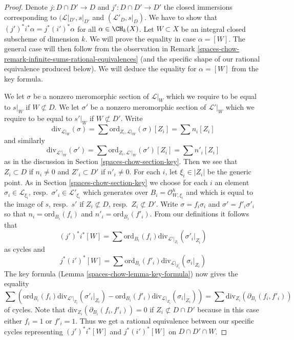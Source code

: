 \begin{proof}
Denote $j : D \cap D' \to D$ and $j' : D \cap D' \to D'$ the closed
immersions corresponding to $(\mathcal{L}|_{D'}, s|_{D'}$ and
$(\mathcal{L}'_D, s|_D)$. We have to show that
$(j')^*i^*\alpha = j^* (i')^*\alpha$ for all $\alpha \in \CH_k(X)$.
Let $W \subset X$ be an integral closed subscheme of dimension $k$.
We will prove the equality in case $\alpha = [W]$.
The general case will then follow from the observation in
Remark \ref{spaces-chow-remark-infinite-sums-rational-equivalences}
(and the specific shape of our rational equivalence produced below).
We will deduce the equality for $\alpha = [W]$ from the key formula.

\medskip\noindent
We let $\sigma$ be a nonzero meromorphic section of $\mathcal{L}|_W$
which we require to be equal to $s|_W$ if $W \not \subset D$.
We let $\sigma'$ be a nonzero meromorphic section of $\mathcal{L}'|_W$
which we require to be equal to $s'|_W$ if $W \not \subset D'$.
Write
$$
\text{div}_{\mathcal{L}|_W}(\sigma) =
\sum \text{ord}_{Z_i, \mathcal{L}|_W}(\sigma)[Z_i] = \sum n_i[Z_i]
$$
and similarly
$$
\text{div}_{\mathcal{L}'|_W}(\sigma') =
\sum \text{ord}_{Z_i, \mathcal{L}'|_W}(\sigma')[Z_i] = \sum n'_i[Z_i]
$$
as in the discussion in Section \ref{spaces-chow-section-key}.
Then we see that $Z_i \subset D$ if $n_i \not = 0$ and
$Z'_i \subset D'$ if $n'_i \not = 0$. For each $i$, let $\xi_i \in |Z_i|$
be the generic point. As in Section \ref{spaces-chow-section-key} we choose
for each $i$ an element
$\sigma_i \in \mathcal{L}_{\xi_i}$, resp.\ $\sigma'_i \in \mathcal{L}'_{\xi_i}$
which generates over $B_i = \mathcal{O}_{W, \xi_i}^h$
and which is equal to the image of
$s$, resp.\ $s'$ if $Z_i \not \subset D$, resp.\ $Z_i \not \subset D'$.
Write $\sigma = f_i \sigma_i$ and $\sigma' = f'_i\sigma'_i$ so that
$n_i = \text{ord}_{B_i}(f_i)$ and
$n'_i = \text{ord}_{B_i}(f'_i)$.
From our definitions it follows that
$$
(j')^*i^*[W] =
\sum \text{ord}_{B_i}(f_i) \text{div}_{\mathcal{L}'|_{Z_i}}(\sigma'_i|_{Z_i})
$$
as cycles and
$$
j^*(i')^*[W] =
\sum \text{ord}_{B_i}(f'_i) \text{div}_{\mathcal{L}|_{Z_i}}(\sigma_i|_{Z_i})
$$
The key formula (Lemma \ref{spaces-chow-lemma-key-formula}) now gives the equality
$$
\sum \left(
\text{ord}_{B_i}(f_i) \text{div}_{\mathcal{L}'|_{Z_i}}(\sigma'_i|_{Z_i}) -
\text{ord}_{B_i}(f'_i) \text{div}_{\mathcal{L}|_{Z_i}}(\sigma_i|_{Z_i})
\right) =
\sum \text{div}_{Z_i}(\partial_{B_i}(f_i, f'_i))
$$
of cycles. Note that $\text{div}_{Z_i}(\partial_{B_i}(f_i, f'_i)) = 0$ if
$Z_i \not \subset D \cap D'$ because in this case either $f_i = 1$
or $f'_i = 1$. Thus we get a rational equivalence between our specific
cycles representing $(j')^*i^*[W]$ and $j^*(i')^*[W]$ on $D \cap D' \cap W$.
\end{proof}

